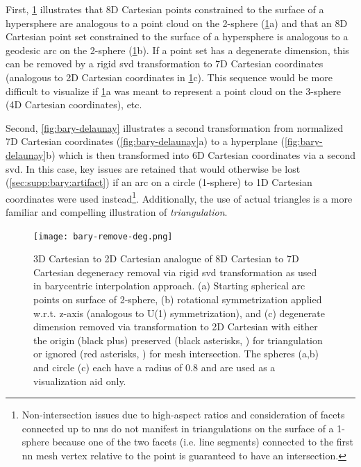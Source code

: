 \documentclass[final,12pt]{elsarticle}
\begin{document}
First, \cref{fig:bary-remove-deg} illustrates that 8D Cartesian points constrained to the surface of a hypersphere are analogous to a point cloud on the 2-sphere (\cref{fig:bary-remove-deg}a) and that an 8D Cartesian point set constrained to the surface of a hypersphere is analogous to a geodesic arc on the 2-sphere (\cref{fig:bary-remove-deg}b). If a point set has a degenerate dimension, this can be removed by a rigid \gls{svd} transformation to 7D Cartesian coordinates (analogous to 2D Cartesian coordinates in \cref{fig:bary-remove-deg}c). This sequence would be more difficult to visualize if \cref{fig:bary-remove-deg}a was meant to represent a point cloud on the 3-sphere (4D Cartesian coordinates), etc.

Second, \cref{fig:bary-delaunay} illustrates a second transformation from normalized 7D Cartesian coordinates (\cref{fig:bary-delaunay}a) to a hyperplane (\cref{fig:bary-delaunay}b) which is then transformed into 6D Cartesian coordinates via a second \gls{svd}. In this case, key issues are retained that would otherwise be lost (\cref{sec:supp:bary:artifact}) if an arc on a circle (1-sphere) to 1D Cartesian coordinates were used instead\footnote{Non-intersection issues due to high-aspect ratios and consideration of facets connected up to  \glspl{nn} do not manifest in triangulations on the surface of a 1-sphere because one of the two facets (i.e. line segments) connected to the first \gls{nn} mesh vertex relative to the \outpt{} point is guaranteed to have an intersection.}. Additionally, the use of actual triangles is a more familiar and compelling illustration of \textit{triangulation}.

\begin{figure}
	\centering
	\texttt{[image: bary-remove-deg.png]}
	\caption{3D Cartesian to 2D Cartesian analogue of 8D Cartesian to 7D Cartesian degeneracy removal via rigid \gls{svd} transformation as used in barycentric interpolation approach. (a) Starting spherical arc points on surface of 2-sphere, (b) rotational symmetrization applied w.r.t. z-axis (analogous to U(1) symmetrization), and (c) degenerate dimension removed via  transformation to 2D Cartesian with either the origin (black plus) preserved (black asterisks, ) for triangulation or ignored (red asterisks, ) for mesh intersection. The spheres (a,b) and circle (c) each have a radius of 0.8 and are used as a visualization aid only.}
	\label{fig:bary-remove-deg}
\end{figure}
\end{document}
